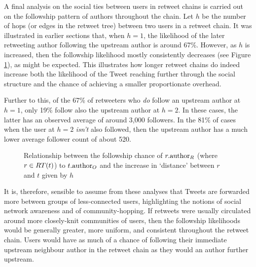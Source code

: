 A final analysis on the social ties between users in retweet chains is carried out on the followship pattern of authors throughout the chain. Let $h$ be the number of hops (or edges in the retweet tree) between two users in a retweet chain. It was illustrated in earlier sections that, when $h = 1$, the likelihood of the later retweeting author following the upstream author is around 67\%. However, as $h$ is increased, then the followship likelihood mostly consistently decreases (see Figure \ref{fig:following-possibility}), as might be expected. This illustrates how longer retweet chains do indeed increase both the likelihood of the Tweet reaching further through the social structure and the chance of achieving a smaller proportionate overhead.

Further to this, of the 67\% of retweeters who \textit{do} follow an upstream author at $h = 1$, only 19\% follow also the upstream author at $h = 2$. In these cases, the latter has an observed average of around 3,000 followers. In the 81\% of cases when the user at $h = 2$ \textit{isn't} also followed, then the upstream author has a much lower average follower count of about 520.

\begin{figure}[h]
\centering
    \caption{Relationship between the followship chance of $r.\textrm{author}_R$ (where $r \in RT(t)$) to $t.\textrm{author}_O$ and the increase in `distance' between $r$ and $t$ given by $h$}
\label{fig:following-possibility}
\end{figure}



It is, therefore, sensible to assume from these analyses that Tweets are forwarded more between groups of less-connected users, highlighting the notions of social network awareness and of community-hopping. If retweets were usually circulated around more closely-knit communities of users, then the followship likelihoods would be generally greater, more uniform, and consistent throughout the retweet chain. Users would have as much of a chance of following their immediate upstream neighbour author in the retweet chain as they would an author further upstream.


